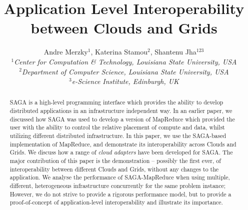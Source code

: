 \documentclass[conference,final]{IEEEtran}
\title{Application Level Interoperability between Clouds and Grids}
\author{Andre Merzky$^{1}$,  Katerina Stamou$^{2}$, Shantenu Jha$^{123}$\\
  \small{\emph{$^{1}$Center for Computation \& Technology, Louisiana
      State University, USA}}\\
  \small{\emph{$^{2}$Department of Computer Science, Louisiana State
      University, USA}}\\
  \small{\emph{$^{3}$e-Science Institute, Edinburgh, UK}}\\
}
\newcommand{\sagamapreduce }{SAGA-MapReduce }
\begin{document}
\maketitle

\begin{abstract}
  SAGA is a high-level programming interface which provides the
  ability to develop distributed applications in an infrastructure
  independent way. In an earlier paper, we discussed how SAGA was used
  to develop a version of MapReduce which provided the user with the
  ability to control the relative placement of compute and data,
  whilst utilizing different distributed infrastructure. In this
  paper, we use the SAGA-based implementation of MapReduce, and
  demonstrate its interoperability across Clouds and Grids.  We
  discuss how a range of {\it cloud adapters} have been developed for
  SAGA.  The major contribution of this paper is the demonstration --
  possibly the first ever, of interoperability between different
  Clouds and Grids, without any changes to the application. We analyse
  the performance of \sagamapreduce when using multiple, different,
  heterogeneous infrastructure concurrently for the same problem
  instance;
  However, we do not strive to provide a rigorous performance model, but to
  provide a proof-of-concept of application-level interoperability and
  illustrate its importance.
\end{abstract}
\end{document}
